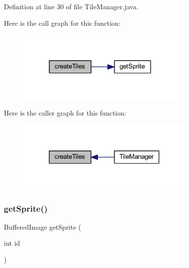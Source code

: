 Definition at line 30 of file Tile\+Manager.\+java.

Here is the call graph for this function\+:
\nopagebreak
\begin{figure}[H]
\begin{center}
\leavevmode
\includegraphics[width=236pt]{classblocchi_1_1_tile_manager_abb7fa074b36e6e355db16761115fb367_cgraph}
\end{center}
\end{figure}
Here is the caller graph for this function\+:
\nopagebreak
\begin{figure}[H]
\begin{center}
\leavevmode
\includegraphics[width=249pt]{classblocchi_1_1_tile_manager_abb7fa074b36e6e355db16761115fb367_icgraph}
\end{center}
\end{figure}
\mbox{\label{classblocchi_1_1_tile_manager_a46ebd32c7ec4ac506010fe465687bdd7}} 
\subsubsection{\texorpdfstring{get\+Sprite()}{getSprite()}\hspace{0.1cm}{\footnotesize\ttfamily [1/2]}}
{\footnotesize\ttfamily Buffered\+Image get\+Sprite (\begin{DoxyParamCaption}\item[{int}]{id }\end{DoxyParamCaption})}



